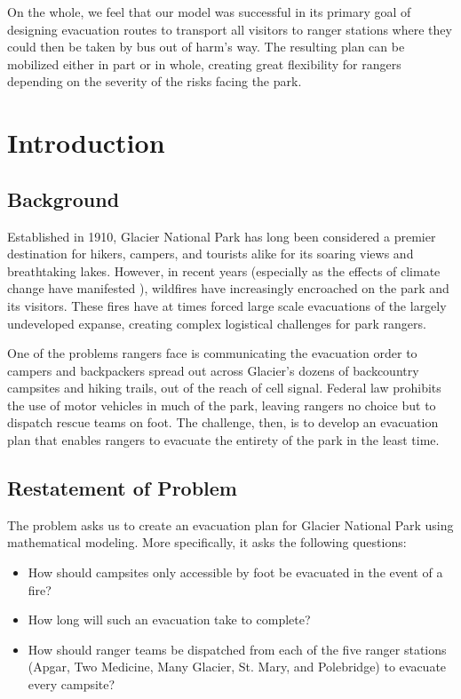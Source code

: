 \documentclass[12pt]{article}
\begin{document}
On the whole, we feel that our model was successful in its primary goal of designing evacuation routes to transport all visitors to ranger stations where they could then be taken by bus out of harm's way. The resulting plan can be mobilized either in part or in whole, creating great flexibility for rangers depending on the severity of the risks facing the park.

\newpage
\tableofcontents

\section{Introduction}
\subsection{Background}
Established in 1910, Glacier National Park has long been considered a premier destination for hikers, campers, and tourists alike for its soaring views and breathtaking lakes. However, in recent years (especially as the effects of climate change have manifested \cite{climateChangeFires}), wildfires have increasingly encroached on the park and its visitors. These fires have at times forced large scale evacuations of the largely undeveloped expanse, creating complex logistical challenges for park rangers. 

One of the problems rangers face is communicating the evacuation order to campers and backpackers spread out across Glacier's dozens of backcountry campsites and hiking trails, out of the reach of cell signal. Federal law prohibits the use of motor vehicles in much of the park, leaving rangers no choice but to dispatch rescue teams on foot. The challenge, then, is to develop an evacuation plan that enables rangers to evacuate the entirety of the park in the least time.

\subsection{Restatement of Problem}
The problem asks us to create an evacuation plan for Glacier National Park using mathematical modeling. More specifically, it asks the following questions:
\begin{itemize}
    \item How should campsites only accessible by foot be evacuated in the event of a fire?
    \item How long will such an evacuation take to complete?
    \item How should ranger teams be dispatched from each of the five ranger stations (Apgar, Two Medicine, Many Glacier, St. Mary, and Polebridge) to evacuate every campsite?
\end{itemize}
\end{document}

